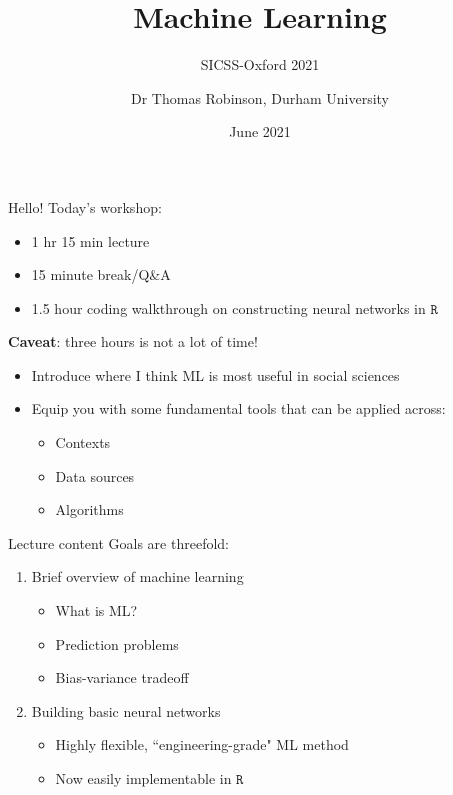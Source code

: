 \documentclass[
  ignorenonframetext,
]{beamer}
\title{Machine Learning}
\subtitle{SICSS-Oxford 2021}
\author{Dr Thomas Robinson, Durham University}
\date{June 2021}
\providecommand{\tightlist}{%
  \setlength{\itemsep}{0pt}\setlength{\parskip}{0pt}}
\begin{document}
\frame{\titlepage}

\begin{frame}{Hello!}
\protect\hypertarget{hello}{}
Today's workshop:

\begin{itemize}
\tightlist
\item
  1 hr 15 min lecture
\item
  15 minute break/Q\&A
\item
  1.5 hour coding walkthrough on constructing neural networks in
  \(\texttt{R}\)
\end{itemize}

\textbf{Caveat}: three hours is not a lot of time!

\begin{itemize}
\tightlist
\item
  Introduce where I think ML is most useful in social sciences
\item
  Equip you with some fundamental tools that can be applied across:

  \begin{itemize}
  \tightlist
  \item
    Contexts
  \item
    Data sources
  \item
    Algorithms
  \end{itemize}
\end{itemize}
\end{frame}

\begin{frame}{Lecture content}
\protect\hypertarget{lecture-content}{}
Goals are threefold:

\begin{enumerate}
\item
  Brief overview of machine learning

  \begin{itemize}
  \tightlist
  \item
    What is ML?
  \item
    Prediction problems
  \item
    Bias-variance tradeoff
  \end{itemize}
\item
  Building basic neural networks

  \begin{itemize}
  \tightlist
  \item
    Highly flexible, ``engineering-grade" ML method
  \item
    Now easily implementable in \(\texttt{R}\)
  \end{itemize}
\end{enumerate}
\end{frame}
\end{document}
